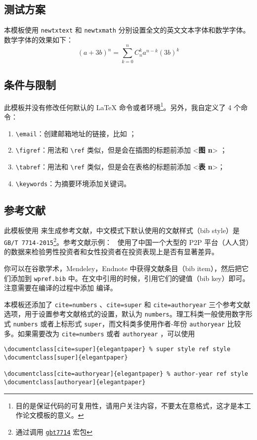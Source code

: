 \documentclass[lang=cn,11pt,a4paper]{elegantpaper}
\begin{document}
\subsection{测试方案}

本模板使用 \lstinline{newtxtext} 和 \lstinline{newtxmath} 分别设置全文的英文文本字体和数学字体。数学字体的效果如下：
\begin{equation}
(a+3b)^{n} = \sum_{k=0}^{n} C_{n}^{k} a^{n-k} (3b)^k\label{eq:binom}
\end{equation}

\subsection{条件与限制}
此模板并没有修改任何默认的 \LaTeX{} 命令或者环境\footnote{目的是保证代码的可复用性，请用户关注内容，不要太在意格式，这才是本工作论文模板的意义。}。另外，我自定义了 4 个命令：
\begin{enumerate}
  \item \lstinline{\email}：创建邮箱地址的链接，比如 ；
  \item \lstinline{\figref}：用法和 \lstinline{\ref} 类似，但是会在插图的标题前添加 <\textbf{图 n}> ；
  \item \lstinline{\tabref}：用法和 \lstinline{\ref} 类似，但是会在表格的标题前添加 <\textbf{表 n}>；
  \item \lstinline{\keywords}：为摘要环境添加关键词。
\end{enumerate}

\subsection{参考文献}
此模板使用  来生成参考文献，中文模式下默认使用的文献样式（bib style）是 \lstinline{GB/T 7714-2015}\footnote{通过调用 \href{https://ctan.org/pkg/gbt7714}{\lstinline{gbt7714}} 宏包}。参考文献示例：~\cite{en3} 使用了中国一个大型的 P2P 平台（人人贷）的数据来检验男性投资者和女性投资者在投资表现上是否有显著差异。

你可以在谷歌学术，Mendeley，Endnote 中获得文献条目（bib item），然后把它们添加到 \lstinline{wpref.bib} 中。在文中引用的时候，引用它们的键值（bib key）即可。注意需要在编译的过程中添加  编译。

本模板还添加了 \lstinline{cite=numbers} 、\lstinline{cite=super} 和 \lstinline{cite=authoryear}  三个参考文献选项，用于设置参考文献格式的设置，默认为 \lstinline{numbers}。理工科类一般使用数字形式 \lstinline{numbers} 或者上标形式 \lstinline{super}，而文科类多使用作者-年份 \lstinline{authoryear} 比较多。如果需要改为 \lstinline{cite=numbers}  或者  \lstinline{authoryear} ，可以使用
\begin{lstlisting}
\documentclass[cite=super]{elegantpaper} % super style ref style
\documentclass[super]{elegantpaper}

\documentclass[cite=authoryear]{elegantpaper} % author-year ref style
\documentclass[authoryear]{elegantpaper}
\end{lstlisting}
\end{document}
